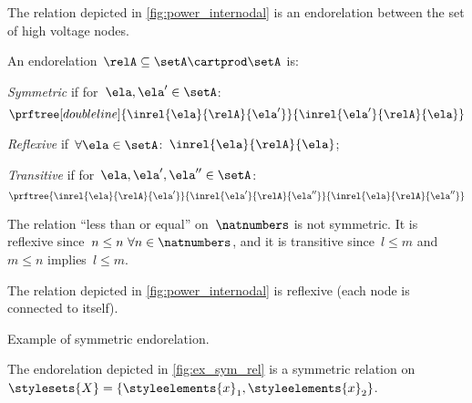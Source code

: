 \begin{example}
    The relation depicted in \cref{fig:power_internodal} is an endorelation between the set of high voltage nodes.
\end{example}

\begin{definition}
    \label{def:properties-endorelations}
    An endorelation~$\relA\subseteq \setA\cartprod \setA$ is:
    \begin{compactitem}
        \item \emph{Symmetric} if for~$\ela, \ela'\in \setA$:
        \begin{equation}
            \prftree[double line]{\inrel{\ela}{\relA}{\ela'}}{\inrel{\ela'}{\relA}{\ela}}
        \end{equation}
        \item \emph{Reflexive} if~$\forall \ela\in \setA$:~$\inrel{\ela}{\relA}{\ela}$;
        \item \emph{Transitive} if for~$\ela, \ela', \ela'' \in \setA$:
        \begin{equation}
            \prftree{\inrel{\ela}{\relA}{\ela'}}{\inrel{\ela'}{\relA}{\ela''}}{\inrel{\ela}{\relA}{\ela''}}
        \end{equation}
    \end{compactitem}
\end{definition}

\begin{example}
    The relation ``less than or equal'' on~$\natnumbers$ is not symmetric.
    It is reflexive since~$n\leq n \ \forall n\in \natnumbers$, and it is transitive since~$l\leq m$ and~$m\leq n$ implies~$l\leq m$.
\end{example}

\begin{example}
    The relation depicted in \cref{fig:power_internodal} is reflexive (each node is connected to itself).
\end{example}
\begin{marginfigure}
    \centering
    \caption{Example of symmetric endorelation.}
    \label{fig:ex_sym_rel}
\end{marginfigure}
\begin{example}
    The endorelation depicted in \cref{fig:ex_sym_rel} is a symmetric relation on~$\stylesets{X}=\{\styleelements{x}_1,\styleelements{x}_2\}$.
\end{example}

